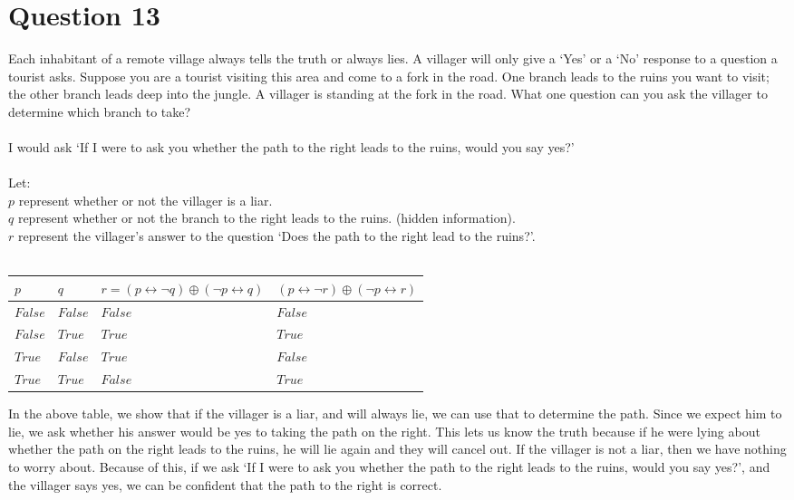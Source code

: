 \documentclass[12pt]{extarticle}
\begin{document}
\section*{Question 13}
	Each inhabitant of a remote village always tells the truth or always lies. A villager will only give a `Yes' or a `No' response to a question a tourist asks. Suppose you are a tourist visiting this area and come to a fork in the road. One branch leads to the ruins you want to visit; the other branch leads deep into the jungle. A villager is standing at the fork in the road. What one question can you ask the villager to determine which branch to take?\\\\
	I would ask `If I were to ask you whether the path to the right leads to the ruins, would you say yes?'\\\\
	Let:\\
		\hspace*{1cm}$p$ represent whether or not the villager is a liar.\\
		\hspace*{1cm}$q$ represent whether or not the branch to the right leads to the ruins. (hidden information).\\
		\hspace*{1cm}$r$ represent the villager's answer to the question `Does the path to the right lead to the ruins?'.\\ \\
	\begin{center}
		\begin{tabular}{ | p{2cm} | p{2cm} | p{5cm} | p{5cm} |}
			\hline$p$ & $q$ & $r = (p \leftrightarrow \neg q) \oplus (\neg p \leftrightarrow q)$ & $(p \leftrightarrow \neg r) \oplus (\neg p \leftrightarrow  r)$ \\ \hline \hline
			$False$ & $False$ & $False$ & $False$\\ \hline 
			$False$ & $True$ & $True$ & $True$\\ \hline
			$True$ & $False$ & $True$ & $False$\\ \hline
			$True$ & $True$ & $False$ & $True$\\ \hline
		\end{tabular}
	\end{center}
	In the above table, we show that if the villager is a liar, and will always lie, we can use that to determine the path.  Since we expect him to lie, we ask whether his answer would be yes to taking the path on the right.  This lets us know the truth because if he were lying about whether the path on the right leads to the ruins, he will lie again and they will cancel out.  If the villager is not a liar, then we have nothing to worry about.  Because of this, if we ask `If I were to ask you whether the path to the right leads to the ruins, would you say yes?', and the villager says yes, we can be confident that the path to the right is correct.
\end{document}

